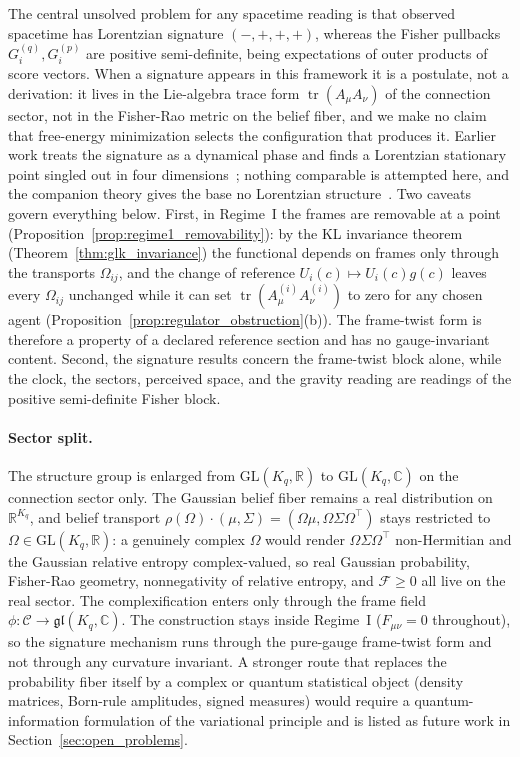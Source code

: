The central unsolved problem for any spacetime reading is that observed spacetime has Lorentzian signature $(-,+,+,+)$, whereas the Fisher pullbacks $G_i^{(q)}, G_i^{(p)}$ are positive semi-definite, being expectations of outer products of score vectors. When a signature appears in this framework it is a postulate, not a derivation: it lives in the Lie-algebra trace form $\operatorname{tr}(A_\mu A_\nu)$ of the connection sector, not in the Fisher-Rao metric on the belief fiber, and we make no claim that free-energy minimization selects the configuration that produces it. Earlier work treats the signature as a dynamical phase and finds a Lorentzian stationary point singled out in four dimensions~\cite{Greensite1993}; nothing comparable is attempted here, and the companion theory gives the base no Lorentzian structure~\cite[Ch.~1]{DennisGaugeVFE2026}. Two caveats govern everything below. First, in Regime~I the frames are removable at a point (Proposition~\ref{prop:regime1_removability}): by the KL invariance theorem (Theorem~\ref{thm:glk_invariance}) the functional depends on frames only through the transports $\Omega_{ij}$, and the change of reference $U_i(c) \mapsto U_i(c)g(c)$ leaves every $\Omega_{ij}$ unchanged while it can set $\operatorname{tr}(A^{(i)}_\mu A^{(i)}_\nu)$ to zero for any chosen agent (Proposition~\ref{prop:regulator_obstruction}(b)). The frame-twist form is therefore a property of a declared reference section and has no gauge-invariant content. Second, the signature results concern the frame-twist block alone, while the clock, the sectors, perceived space, and the gravity reading are readings of the positive semi-definite Fisher block.

\paragraph{Sector split.} The structure group is enlarged from $\mathrm{GL}(K_q,\mathbb{R})$ to $\mathrm{GL}(K_q,\mathbb{C})$ on the connection sector only. The Gaussian belief fiber remains a real distribution on $\mathbb{R}^{K_q}$, and belief transport $\rho(\Omega)\cdot(\mu,\Sigma) = (\Omega\mu, \Omega\Sigma\Omega^\top)$ stays restricted to $\Omega \in \mathrm{GL}(K_q,\mathbb{R})$: a genuinely complex $\Omega$ would render $\Omega\Sigma\Omega^\top$ non-Hermitian and the Gaussian relative entropy complex-valued, so real Gaussian probability, Fisher-Rao geometry, nonnegativity of relative entropy, and $\mathcal{F} \ge 0$ all live on the real sector. The complexification enters only through the frame field $\phi: \mathcal{C} \to \mathfrak{gl}(K_q,\mathbb{C})$. The construction stays inside Regime~I ($F_{\mu\nu} = 0$ throughout), so the signature mechanism runs through the pure-gauge frame-twist form and not through any curvature invariant. A stronger route that replaces the probability fiber itself by a complex or quantum statistical object (density matrices, Born-rule amplitudes, signed measures) would require a quantum-information formulation of the variational principle and is listed as future work in Section~\ref{sec:open_problems}.

